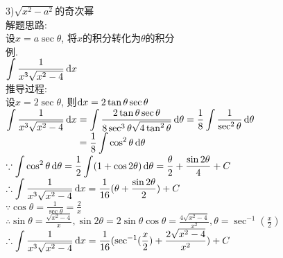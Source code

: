 3)$\sqrt{x^2-a^2}$的奇次幂\\
解题思路:\\
设$x=a\sec\theta$, 将$x$的积分转化为$\theta$的积分\\
例.\\
\phantom{例}$\displaystyle\int\frac{1}{x^3\sqrt{x^2-4}}\mathop{}\!\mathrm{d} x$\\
推导过程:\\
设$x=2\sec\theta$, 则$\mathop{}\!\mathrm{d} x=2\tan\theta\sec\theta$\\
$\displaystyle\int\frac{1}{x^3\sqrt{x^2-4}}\mathop{}\!\mathrm{d} x=\int\frac{2\tan\theta\sec\theta}{8\sec^3\theta\sqrt{4\tan^2\theta}}\mathop{}\!\mathrm{d}\theta=\frac{1}{8}\int\frac{1}{\sec^2\theta}\mathop{}\!\mathrm{d}\theta$\\
$\displaystyle\phantom{\int\frac{1}{x^3\sqrt{x^2-4}}\dif x}=\frac{1}{8}\int\cos^2\theta\dif\theta$\\
$\displaystyle\because\int\cos^2\theta\mathop{}\!\mathrm{d}\theta=\frac{1}{2}\int(1+\cos2\theta)\mathop{}\!\mathrm{d}\theta=\frac{\theta}{2}+\frac{\sin2\theta}{4}+C$\\
$\displaystyle\therefore\int\frac{1}{x^3\sqrt{x^2-4}}\mathop{}\!\mathrm{d} x=\frac{1}{16}(\theta+\frac{\sin2\theta}{2})+C$\\
$\displaystyle\because\cos\theta=\frac{1}{\sec\theta}=\frac{2}{x}$\\
$\displaystyle\therefore\sin\theta=\frac{\sqrt{x^2-4}}{x},\sin2\theta=2\sin\theta\cos\theta=\frac{4\sqrt{x^2-4}}{x^2},\theta=\sec^{-1}(\frac{x}{2})$\\
$\displaystyle\therefore\int\frac{1}{x^3\sqrt{x^2-4}}\mathop{}\!\mathrm{d} x=\frac{1}{16}(\sec^{-1}(\frac{x}{2})+\frac{2\sqrt{x^2-4}}{x^2})+C$\\

